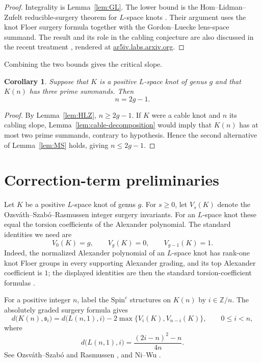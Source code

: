 \documentclass[11pt]{article}
\newtheorem{corollary}[theorem]{Corollary}
\theoremstyle{definition}
\theoremstyle{remark}
\newcommand{\SpinC}{\mathrm{Spin}^{c}}
\newcommand{\ZZ}{\mathbb Z}
\begin{document}
\begin{proof}
Integrality is Lemma~\ref{lem:GL}.  The lower bound is the
Hom--Lidman--Zufelt reducible-surgery theorem for $L$-space knots
\cite{HLZ15}.  Their argument uses the knot Floer surgery formula together
with the Gordon--Luecke lens-space summand.  The result and its role in the
cabling conjecture are also discussed in the recent treatment
\cite{RecentObstructions}, rendered at
\href{https://ar5iv.labs.arxiv.org/html/2209.01672}{ar5iv.labs.arxiv.org}.
\end{proof}

Combining the two bounds gives the critical slope.

\begin{corollary}\label{cor:critical-slope}
Suppose that $K$ is a positive $L$-space knot of genus $g$ and that $K(n)$
has three prime summands.  Then
\[
n=2g-1.
\]
\end{corollary}

\begin{proof}
By Lemma~\ref{lem:HLZ}, $n\ge 2g-1$.  If $K$ were a cable knot and $n$ its
cabling slope, Lemma~\ref{lem:cable-decomposition} would imply that $K(n)$
has at most two prime summands, contrary to hypothesis.  Hence the second
alternative of Lemma~\ref{lem:MS} holds, giving $n\le 2g-1$.
\end{proof}

\section{Correction-term preliminaries}

Let $K$ be a positive $L$-space knot of genus $g$.  For $s\ge 0$, let
$V_s(K)$ denote the Ozsv\'ath--Szab\'o--Rasmussen integer surgery
invariants.  For an $L$-space knot these equal the torsion coefficients of
the Alexander polynomial.  The standard identities we need are
\begin{equation}\label{eq:V-identities}
V_0(K)=g,\qquad V_g(K)=0,\qquad V_{g-1}(K)=1.
\end{equation}
Indeed, the normalized Alexander polynomial of an $L$-space knot has
rank-one knot Floer groups in every supporting Alexander grading, and its
top Alexander coefficient is $1$; the displayed identities are then the
standard torsion-coefficient formulas \cite{OSLens,NiWu}.

For a positive integer $n$, label the $\SpinC$ structures on $K(n)$ by
$i\in\ZZ/n$.  The absolutely graded surgery formula gives
\begin{equation}\label{eq:surgery-d}
d\bigl(K(n),\mathfrak s_i\bigr)
=
d\bigl(L(n,1),i\bigr)
-
2\max\{V_i(K),V_{n-i}(K)\},
\qquad 0\le i<n,
\end{equation}
where
\begin{equation}\label{eq:lens-d}
d\bigl(L(n,1),i\bigr)
=
\frac{(2i-n)^2-n}{4n}.
\end{equation}
See Ozsv\'ath--Szab\'o and Rasmussen \cite{OSAbs,OSLens}, and Ni--Wu
\cite{NiWu}.
\end{document}
